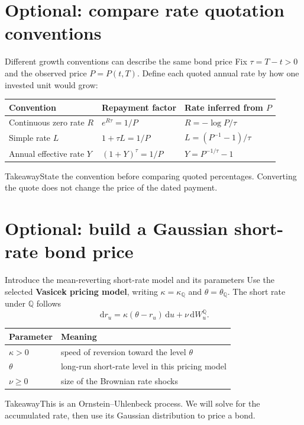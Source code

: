 \documentclass[handout,10pt,t,aspectratio=169]{beamer}
\newenvironment{keybox}{\begin{exampleblock}{Takeaway}}{\end{exampleblock}}
\newcommand{\Q}{\mathbb Q}
\newcommand{\dd}{\,\mathrm d}
\begin{document}
\section{Optional: compare rate quotation conventions}

\begin{frame}{Different growth conventions can describe the same bond price}
\small
Fix \(\tau=T-t>0\) and the observed price \(P=P(t,T)\).
Define each quoted annual rate by how one invested unit would grow:
\begin{center}\begin{tabular}{L{.25\textwidth}L{.25\textwidth}L{.35\textwidth}}
\toprule Convention & Repayment factor & Rate inferred from \(P\)\\\midrule
Continuous zero rate \(R\) & \(e^{R\tau}=1/P\) & \(R=-\log P/\tau\)\\[.7em]
Simple rate \(L\) & \(1+\tau L=1/P\) & \(L=(P^{-1}-1)/\tau\)\\[.7em]
Annual effective rate \(Y\) & \((1+Y)^\tau=1/P\) & \(Y=P^{-1/\tau}-1\)\\\bottomrule
\end{tabular}\end{center}
\begin{keybox}State the convention before comparing quoted percentages.
Converting the quote does not change the price of the dated payment.\end{keybox}
\end{frame}

\section{Optional: build a Gaussian short-rate bond price}

\begin{frame}{Introduce the mean-reverting short-rate model and its parameters}
\small
Use the selected \textbf{Vasicek pricing model}, writing \(\kappa=\kappa_\Q\) and
\(\theta=\theta_\Q\). The short rate under \(\Q\) follows
\[
 \dd r_u=\kappa(\theta-r_u)\dd u+\nu\dd W_u^\Q.
\]
\begin{center}\begin{tabular}{ll}
\toprule Parameter & Meaning\\\midrule
\(\kappa>0\) & speed of reversion toward the level \(\theta\)\\
\(\theta\) & long-run short-rate level in this pricing model\\
\(\nu\geq0\) & size of the Brownian rate shocks\\\bottomrule
\end{tabular}\end{center}
\begin{keybox}This is an Ornstein--Uhlenbeck process.
We will solve for the accumulated rate, then use its Gaussian distribution to price a bond.\end{keybox}
\end{frame}
\end{document}
